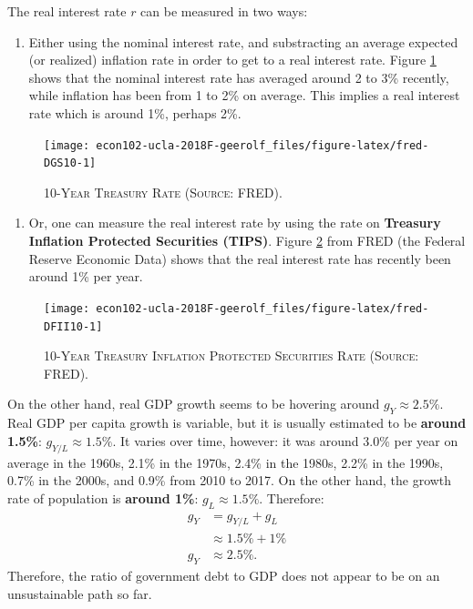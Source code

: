 \documentclass[]{book}
\providecommand{\tightlist}{%
  \setlength{\itemsep}{0pt}\setlength{\parskip}{0pt}}
\theoremstyle{definition}
\theoremstyle{definition}
\theoremstyle{definition}
\theoremstyle{remark}
\begin{document}
The real interest rate \(r\) can be measured in two ways:

\begin{enumerate}
\def\labelenumi{\arabic{enumi}.}
\tightlist
\item
  Either using the nominal interest rate, and substracting an average
  expected (or realized) inflation rate in order to get to a real
  interest rate. Figure \ref{fig:fred-DGS10} shows that the nominal
  interest rate has averaged around 2 to 3\% recently, while inflation
  has been from 1 to 2\% on average. This implies a real interest rate
  which is around 1\%, perhaps 2\%.
\end{enumerate}



\begin{figure}

{\centering \texttt{[image: econ102-ucla-2018F-geerolf\_files/figure-latex/fred-DGS10-1]} 

}

\caption{\textsc{10-Year Treasury Rate (Source: FRED).}}\label{fig:fred-DGS10}
\end{figure}

\begin{enumerate}
\def\labelenumi{\arabic{enumi}.}
\setcounter{enumi}{1}
\tightlist
\item
  Or, one can measure the real interest rate by using the rate on
  \textbf{Treasury Inflation Protected Securities (TIPS)}. Figure
  \ref{fig:fred-DFII10} from FRED (the Federal Reserve Economic Data)
  shows that the real interest rate has recently been around 1\% per
  year.
\end{enumerate}




\begin{figure}

{\centering \texttt{[image: econ102-ucla-2018F-geerolf\_files/figure-latex/fred-DFII10-1]} 

}

\caption{\textsc{10-Year Treasury Inflation Protected
Securities Rate (Source: FRED).}}\label{fig:fred-DFII10}
\end{figure}

On the other hand, real GDP growth seems to be hovering around
\(g_Y \approx 2.5\%\). Real GDP per capita growth is variable, but it is
usually estimated to be \textbf{around 1.5\%}:
\(g_{Y/L} \approx 1.5\%\). It varies over time, however: it was around
3.0\% per year on average in the 1960s, 2.1\% in the 1970s, 2.4\% in the
1980s, 2.2\% in the 1990s, 0.7\% in the 2000s, and 0.9\% from 2010 to
2017. On the other hand, the growth rate of population is \textbf{around
1\%}: \(g_{L} \approx 1.5\%\). Therefore: \[
\begin{aligned}
g_Y &= g_{Y/L} + g_L\\
&\approx 1.5\% + 1\% \\
g_Y &\approx 2.5\%.
\end{aligned}
\] Therefore, the ratio of government debt to GDP does not appear to be
on an unsustainable path so far.
\end{document}
